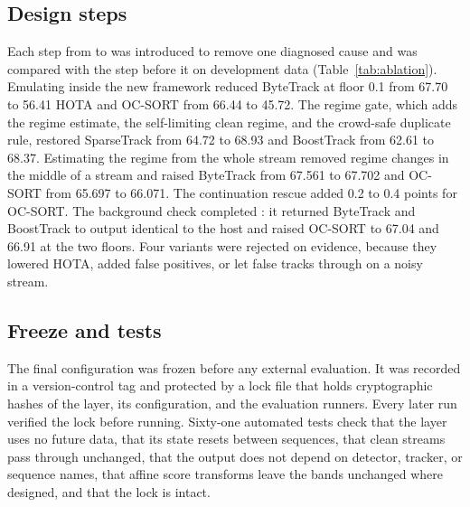 \subsection{Design steps}\label{sec:steps}
Each step from \aob{} to \scl{} was introduced to remove one diagnosed cause
and was compared with the step before it on development data
(Table~\ref{tab:ablation}). Emulating \aob{} inside the new framework reduced
ByteTrack at floor 0.1 from 67.70 to 56.41 HOTA and OC-SORT from 66.44 to
45.72. The regime gate, which adds the regime estimate, the self-limiting
clean regime, and the crowd-safe duplicate rule, restored SparseTrack from
64.72 to 68.93 and BoostTrack from 62.61 to 68.37. Estimating the regime from
the whole stream removed regime changes in the middle of a stream and raised
ByteTrack from 67.561 to 67.702 and OC-SORT from 65.697 to 66.071. The
continuation rescue added 0.2 to 0.4 points for OC-SORT. The background check
completed \scl{}: it returned ByteTrack and BoostTrack to output identical to
the host and raised OC-SORT to 67.04 and 66.91 at the two floors. Four
variants were rejected on evidence, because they lowered HOTA, added false
positives, or let false tracks through on a noisy stream.



\subsection{Freeze and tests}\label{sec:freeze}
The final configuration was frozen before any external evaluation. It was
recorded in a version-control tag and protected by a lock file that holds
cryptographic hashes of the layer, its configuration, and the evaluation
runners. Every later run verified the lock before running. Sixty-one automated
tests check that the layer uses no future data, that its state resets between
sequences, that clean streams pass through unchanged, that the output does not
depend on detector, tracker, or sequence names, that affine score transforms
leave the bands unchanged where designed, and that the lock is intact.
